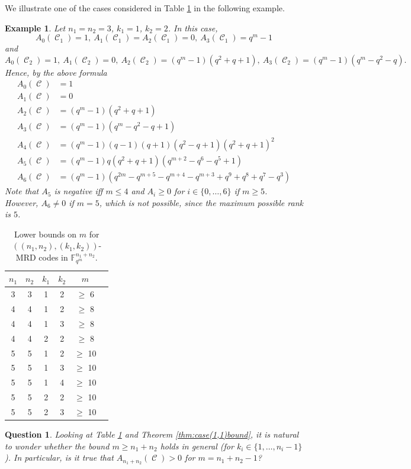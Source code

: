 \documentclass[11pt]{amsart}
\DeclareMathOperator{\C}{\mathcal{C}}
\newtheorem{example}[theorem]{Example}
\newtheorem{question}[theorem]{Question}
\newcommand{\fqm}{\mathbb{F}_{q^m}}
\begin{document}
We illustrate one of the cases considered in Table \ref{tab:dati} in the following example.

\begin{example}
Let $n_1=n_2=3$, $k_1=1$, $k_2=2$. In this case, 
$$A_0(\C_1)=1, \ A_1(\C_1)=A_2(\C_1)=0, \ A_3(\C_1)=q^m-1$$
and
$$A_0(\C_2)=1, \ A_1(\C_2)=0, \ A_2(\C_2)=(q^m-1)(q^2+q+1), \ A_3(\C_2)=(q^m-1)(q^m-q^2-q).$$
Hence, by the above formula
\begin{align*}
A_0(\C) & = 1\\
A_1(\C) & = 0\\
A_2(\C) & = (q^m-1)(q^2+q+1) \\
A_3(\C) & = (q^m-1)(q^m-q^2-q+1) \\
A_4(\C) & = (q^m-1)(q-1)(q+1)(q^2-q+1)(q^2+q+1)^2\\
A_5(\C) & = (q^m-1)q(q^2+q+1)(q^{m+2}-q^6-q^5+1) \\
A_6(\C) & = (q^m-1)(q^{2m}-q^{m+5}-q^{m+4}-q^{m+3}+q^{9}+q^{8}+q^{7}-q^3)
\end{align*}
Note that $A_5$ is negative iff $m\leq 4$ and $A_i\geq 0$ for $i\in\{0,\ldots,6\}$ if $m\geq 5$. However, $A_6\neq 0$ if $m=5$, which is not possible, since the maximum possible rank is $5$.  
\end{example}


\begin{table}[h!]
\centering
\begin{tabular}{cccccc}
\hline
$n_1$ & $n_2$ & $k_1$ & $k_2$ & $m$ \\
\hline
3 & 3 & 1 & 2 & $\geq$ 6 \\
4 & 4 & 1 & 2 & $\geq$ 8 \\
4 & 4 & 1 & 3 & $\geq$ 8 \\
4 & 4 & 2 & 2 & $\geq$ 8 \\
5 & 5 & 1 & 2 & $\geq$ 10 \\
5 & 5 & 1 & 3 & $\geq$ 10 \\
5 & 5 & 1 & 4 & $\geq$ 10 \\
5 & 5 & 2 & 2 & $\geq$ 10 \\
5 & 5 & 2 & 3 & $\geq$ 10 \\
\hline
\end{tabular}
\caption{Lower bounds on $m$ for $((n_1,n_2),(k_1,k_2))$-MRD codes in $\fqm^{n_1+n_2}$.}
\label{tab:dati}
\end{table}

\begin{question}
Looking at Table \ref{tab:dati} and Theorem \ref{thm:case(1,1)bound}, it is natural to wonder whether the bound 
$m\geq n_1+n_2$ holds in general (for $k_i\in \{1,\ldots,n_i-1\}$). In particular, is it true that $A_{n_1+n_2}(\C)>0$ for $m=n_1+n_2-1$?
\end{question}
\end{document}
